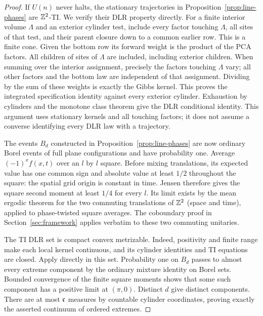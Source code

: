 \begin{proof}
If $U(n)$ never halts, the stationary trajectories in
Proposition~\ref{prop:line-phases} are $\mathbb Z^2$-TI. We verify their DLR
property directly. For a finite interior volume $\Lambda$ and an
exterior cylinder test, include every factor touching $\Lambda$,
all sites of that test, and their parent closure down to a common
earlier row. This is a finite cone. Given the bottom row its
forward weight is the product of the PCA factors. All children
of sites of $\Lambda$ are included, including exterior children.
When summing over the interior assignment, precisely the factors
touching $\Lambda$ vary; all other factors and the bottom law are
independent of that assignment. Dividing by the sum of these weights
is exactly the Gibbs kernel. This proves the integrated specification
identity against every exterior cylinder. Exhaustion by cylinders
and the monotone class theorem give the DLR conditional identity.
This argument uses stationary kernels and all touching factors; it
does not assume a converse identifying every DLR law with a trajectory.

The events $B_d$ constructed in Proposition~\ref{prop:line-phases}
are now ordinary Borel events of full plane configurations and have
probability one. Average $(-1)^x f(x,t)$ over an $l$ by $l$ square.
Before mixing translations, its expected value has one common sign
and absolute value at least $1/2$ throughout the square: the spatial
grid origin is constant in time. Jensen therefore gives the square
second moment at least $1/4$ for every $l$. Its limit exists by the
mean ergodic theorem for the two commuting translations of $\mathbb Z^2$
(space and time), applied to phase-twisted square averages. The
coboundary proof in Section~\ref{sec:framework} applies verbatim to
these two commuting unitaries.

The TI DLR set is compact convex metrizable. Indeed, positivity and
finite range make each local kernel continuous, and its cylinder
identities and TI equations are closed. Apply
\cite[Theorem~4.2]{bishop-deleeuw} directly in this set. Probability
one on $B_d$ passes to almost every extreme component by the ordinary
mixture identity on Borel sets. Bounded convergence of the finite
square moments shows that some such component has a positive limit
at $(\pi,0)$. Distinct $d$ give distinct components. There are at
most $\mathfrak c$ measures by countable cylinder coordinates, proving
exactly the asserted continuum of ordered extremes.
\end{proof}

